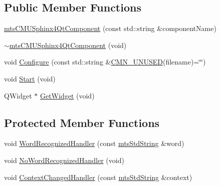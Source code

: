 \subsection*{Public Member Functions}
\begin{DoxyCompactItemize}
\item 
\hyperlink{classmts_c_m_u_sphinx4_qt_component_a99d06e5070cb5e6d5f98fde9c306fac2}{mts\-C\-M\-U\-Sphinx4\-Qt\-Component} (const std\-::string \&component\-Name)
\item 
\hyperlink{classmts_c_m_u_sphinx4_qt_component_a13a44800fbe7640f02e8858e7afb155f}{$\sim$mts\-C\-M\-U\-Sphinx4\-Qt\-Component} (void)
\item 
void \hyperlink{classmts_c_m_u_sphinx4_qt_component_ad5e5c6bcb776e24ed383a6cdbe4f158a}{Configure} (const std\-::string \&\hyperlink{cmn_portability_8h_a021894e2626935fa2305434b1e893ff6}{C\-M\-N\-\_\-\-U\-N\-U\-S\-E\-D}(filename)=\char`\"{}\char`\"{})
\item 
void \hyperlink{classmts_c_m_u_sphinx4_qt_component_a2ff0d587355344fbb79c8a51243b0c57}{Start} (void)
\item 
Q\-Widget $\ast$ \hyperlink{classmts_c_m_u_sphinx4_qt_component_a1004dc0a6a1793d23eda7ec0c50fbfeb}{Get\-Widget} (void)
\end{DoxyCompactItemize}
\subsection*{Protected Member Functions}
\begin{DoxyCompactItemize}
\item 
void \hyperlink{classmts_c_m_u_sphinx4_qt_component_addbc603b7e2ba691bdc10e5e6f902f48}{Word\-Recognized\-Handler} (const \hyperlink{mts_generic_object_proxy_8h_adbc21bfbf98367e582bf8a263b7e711f}{mts\-Std\-String} \&word)
\item 
void \hyperlink{classmts_c_m_u_sphinx4_qt_component_a390266dd80e6fc584e92530ef4e4e789}{No\-Word\-Recognized\-Handler} (void)
\item 
void \hyperlink{classmts_c_m_u_sphinx4_qt_component_a5ef01cde522691827956533901c85fdf}{Context\-Changed\-Handler} (const \hyperlink{mts_generic_object_proxy_8h_adbc21bfbf98367e582bf8a263b7e711f}{mts\-Std\-String} \&context)
\end{DoxyCompactItemize}
